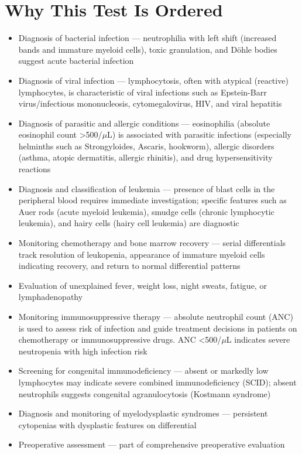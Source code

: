 \section*{Why This Test Is Ordered}
\begin{itemize}
  \item Diagnosis of bacterial infection --- neutrophilia with left shift (increased bands and immature myeloid cells), toxic granulation, and D\"{o}hle bodies suggest acute bacterial infection
  \item Diagnosis of viral infection --- lymphocytosis, often with atypical (reactive) lymphocytes, is characteristic of viral infections such as Epstein-Barr virus/infectious mononucleosis, cytomegalovirus, HIV, and viral hepatitis
  \item Diagnosis of parasitic and allergic conditions --- eosinophilia (absolute eosinophil count >500/$\mu$L) is associated with parasitic infections (especially helminths such as Strongyloides, Ascaris, hookworm), allergic disorders (asthma, atopic dermatitis, allergic rhinitis), and drug hypersensitivity reactions
  \item Diagnosis and classification of leukemia --- presence of blast cells in the peripheral blood requires immediate investigation; specific features such as Auer rods (acute myeloid leukemia), smudge cells (chronic lymphocytic leukemia), and hairy cells (hairy cell leukemia) are diagnostic
  \item Monitoring chemotherapy and bone marrow recovery --- serial differentials track resolution of leukopenia, appearance of immature myeloid cells indicating recovery, and return to normal differential patterns
  \item Evaluation of unexplained fever, weight loss, night sweats, fatigue, or lymphadenopathy
  \item Monitoring immunosuppressive therapy --- absolute neutrophil count (ANC) is used to assess risk of infection and guide treatment decisions in patients on chemotherapy or immunosuppressive drugs. ANC <500/$\mu$L indicates severe neutropenia with high infection risk
  \item Screening for congenital immunodeficiency --- absent or markedly low lymphocytes may indicate severe combined immunodeficiency (SCID); absent neutrophils suggests congenital agranulocytosis (Kostmann syndrome)
  \item Diagnosis and monitoring of myelodysplastic syndromes --- persistent cytopenias with dysplastic features on differential
  \item Preoperative assessment --- part of comprehensive preoperative evaluation
\end{itemize}

